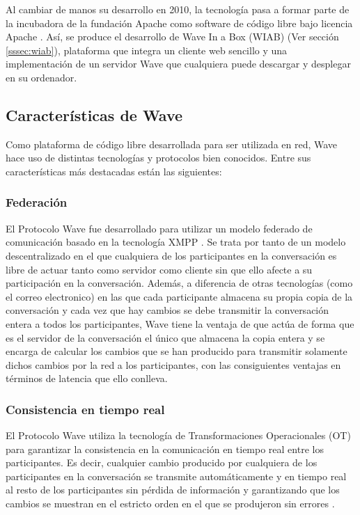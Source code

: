   Al cambiar de manos su desarrollo en 2010, la tecnología pasa a formar parte de la incubadora de la fundación Apache \cite{ref:apache_wave_about} como software de código libre bajo licencia Apache \cite{ref:apache_license}. Así, se produce el desarrollo de Wave In a Box (WIAB) (Ver sección \ref{sssec:wiab}), plataforma que integra un cliente web sencillo y una implementación de un servidor Wave que cualquiera puede descargar y desplegar en su ordenador.
  
  \subsection{Características de Wave}
  
  Como plataforma de código libre desarrollada para ser utilizada en red, Wave hace uso de distintas tecnologías y protocolos bien conocidos. Entre sus características más destacadas están las siguientes:

    \subsubsection{Federación}\label{sssec:federation}
    
    El Protocolo Wave \cite{ref:wave_over_xmpp} fue desarrollado para utilizar un modelo federado \cite{ref:wave_federation} \cite{ref:wave_white_paper} de comunicación basado en la tecnología XMPP \cite{ref:xmpp} \cite{ref:wave_over_xmpp}. Se trata por tanto de un modelo descentralizado en el que cualquiera de los participantes en la conversación es libre de actuar tanto como servidor como cliente sin que ello afecte a su participación en la conversación. 
    Además, a diferencia de otras tecnologías (como el correo electronico) en las que cada participante almacena su propia copia de la conversación y cada vez que hay cambios se debe transmitir la conversación entera a todos los participantes, Wave tiene la ventaja de que actúa de forma que es el servidor de la conversación el único que almacena la copia entera y se encarga de calcular los cambios que se han producido para transmitir solamente dichos cambios por la red a los participantes, con las consiguientes ventajas en términos de latencia que ello conlleva. 

    \subsubsection{Consistencia en tiempo real}\label{sssec:realTime}
    
    El Protocolo Wave \cite{ref:wave_over_xmpp} utiliza la tecnología de Transformaciones Operacionales (OT) \cite{ref:how_ot_works} para garantizar la consistencia en la comunicación en tiempo real entre los participantes. Es decir, cualquier cambio producido por cualquiera de los participantes en la conversación se transmite automáticamente y en tiempo real al resto de los participantes sin pérdida de información y garantizando que los cambios se muestran en el estricto orden en el que se produjeron sin errores \cite{ref:wave_ot}.
    

